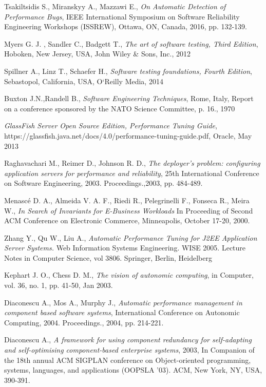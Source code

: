 \documentclass[10pt,a4paper]{article}
\begin{document}
\begin{thebibliography}{9}
Tsakiltsidis S., Miranskyy A., Mazzawi E., 
\textit{On Automatic Detection of Performance Bugs},
IEEE International Symposium on Software Reliability Engineering Workshops (ISSREW), Ottawa, ON, Canada, 2016, pp. 132-139.

Myers G. J. , Sandler C.,  Badgett T.,
\textit{The art of software testing, Third Edition},
Hoboken, New Jersey, USA, John Wiley \& Sons, Inc., 2012

Spillner A., Linz T., Schaefer H.,
\textit{Software testing foundations, Fourth Edition},
Sebastopol, California, USA, O‘Reilly Media, 2014

Buxton J.N.,Randell  B., 
\textit{Software Engineering Techniques}, 
Rome, Italy, Report on a conference sponsored by the NATO Science Committee, p. 16., 1970

\textit{GlassFish Server Open Source Edition, Performance Tuning Guide}, 
https://glassfish.java.net/docs/4.0/performance-tuning-guide.pdf,
Oracle, May 2013

Raghavachari M., Reimer D., Johnson R. D., 
\textit{The deployer's problem: configuring application servers for performance and reliability}, 
25th International Conference on Software Engineering, 2003. Proceedings.,2003, pp. 484-489.

Menascé D. A., Almeida V. A. F., Riedi R., Pelegrinelli F., Fonseca R., Meira W.,  
\textit{In Search of Invariants for E-Business Workloads} 
In Proceeding of Second ACM Conference on Electronic Commerce, Minneapolis, October 17-20, 2000. 

Zhang Y., Qu W., Liu A., 
\textit{Automatic Performance Tuning for J2EE Application Server Systems.}  Web Information Systems Engineering. WISE 2005. Lecture Notes in Computer Science, vol 3806. Springer, Berlin, Heidelberg

Kephart J. O., Chess D. M., 
\textit{The vision of autonomic computing}, in Computer, vol. 36, no. 1, pp. 41-50, Jan 2003.

Diaconescu A., Mos A., Murphy J., \textit{Automatic performance management in component based software systems}, International Conference on Autonomic Computing, 2004. Proceedings., 2004, pp. 214-221.

Diaconescu A., \textit{A framework for using component redundancy for self-adapting and self-optimising component-based enterprise systems}, 2003, In Companion of the 18th annual ACM SIGPLAN conference on Object-oriented programming, systems, languages, and applications (OOPSLA '03). ACM, New York, NY, USA, 390-391. 


\end{thebibliography}
\end{document}
